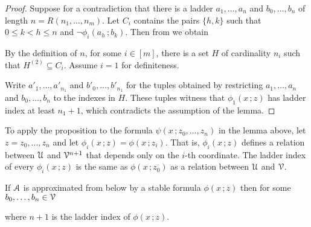 \documentclass[scombinatorics.tex]{subfiles}
\begin{document}
\begin{proof} 
  Suppose for a contradiction that there is a ladder $a_1,\dots,a_n$ and $b_0,\dots,b_n$ of length $n=R(n_1,\dots, n_m)$.
  Let $C_i$ contains the pairs $\{h,k\}$ such that $0\le k<h\le n$ and $\neg\phi_i(a_h\,;b_k)$.
  Then from  we obtain 
  
  
  By the definition of $n$, for some $i\in[m]$, there is a set $H$ of cardinality $n_i$ such that $H^{(2)}\subseteq C_i$.
  Assume $i{=}1$ for definiteness.

  Write $a'_1,\dots,a'_{n_1}$ and $b'_0,\dots,b'_{n_1}$ for the tuples obtained by restricting $a_1,\dots,a_n$ and $b_0,\dots,b_n$ to the indexes in $H$.
  These tuples witness that $\phi_1(x\,;z)$ has ladder index at least $n_1+1$, which contradicts the assumption of the lemma.
\end{proof}

To apply the proposition to the formula $\psi(x\,;z_0,\dots,z_n)$ in the lemma above, let $z=z_0,\dots,z_n$ and let $\phi_i(x\,;z)=\phi(x\,;z_i)$.
That is, $\phi_i(x\,;z)$ defines a relation between $\EuScript U$ and $\EuScript V^{n+1}$ that depends only on the $i$-th coordinate.
The ladder index of every $\phi_i(x\,;z)$ is the same as $\phi(x\,;z_0)$ as a relation between $\EuScript U$ and $\EuScript V$.


\begin{lemma}
  If $\EuScript A$ is approximated from below by a stable formula $\phi(x\,;z)$ then for some $b_0,\dots,b_n\in\EuScript V$ 
  \\[-1ex]
  
  where $n+1$ is the ladder index of $\phi(x\,;z)$. 
\end{lemma}
  
\end{document}

